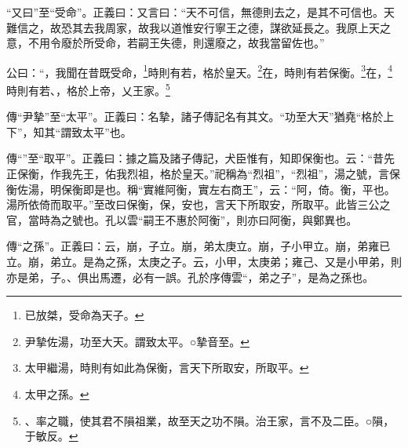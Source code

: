 {\noindent\shu{}\fzkt “又曰”至“受命”。正義曰：又言曰：“天不可信，無德則去之，是其不可信也。天難信之，故恐其去我周家，故我以道惟安行寧王之德，謀欲延長之。我原上天之意，不用令廢於所受命，若嗣王失德，則還廢之，故我當留佐也。” \par}

公曰：“，我聞在昔既受命，\footnote{已放桀，受命為天子。}時則有若，格於皇天。\footnote{尹摯佐湯，功至大天。謂致太平。○摯音至。}在，時則有若保衡。\footnote{太甲繼湯，時則有如此為保衡，言天下所取安，所取平。}在，\footnote{太甲之孫。}時則有若、，格於上帝，乂王家。\footnote{、率之職，使其君不隕祖業，故至天之功不隕。治王家，言不及二臣。○隕，于敏反。}


{\noindent\zhuan{}\fzbyks 傳“尹摯”至“太平”。正義曰：名摯，諸子傳記名有其文。“功至大天”猶堯“格於上下”，知其“謂致太平”也。 \par}

{\noindent\zhuan{}\fzbyks 傳“”至“取平”。正義曰：據之篇及諸子傳記，犬臣惟有，知即保衡也。云：“昔先正保衡，作我先王，佑我烈祖，格於皇天。”祀稱為“烈祖”，“烈祖”，湯之號，言保衡佐湯，明保衡即是也。稱“實維阿衡，實左右商王”，云：“阿，倚。衡，平也。湯所依倚而取平。”至改曰保衡，保，安也，言天下所取安，所取平。此皆三公之官，當時為之號也。孔以雲“嗣王不惠於阿衡”，則亦曰阿衡，與鄭異也。 \par}

{\noindent\zhuan{}\fzbyks 傳“之孫”。正義曰：云，崩，子立。崩，弟太庚立。崩，子小甲立。崩，弟雍已立。崩，弟立。是為之孫，太庚之子。云，小甲，太庚弟；雍己、又是小甲弟，則亦是弟，子。、俱出馬遷，必有一誤。孔於序傳雲“，弟之子”，是為之孫也。 \par}

